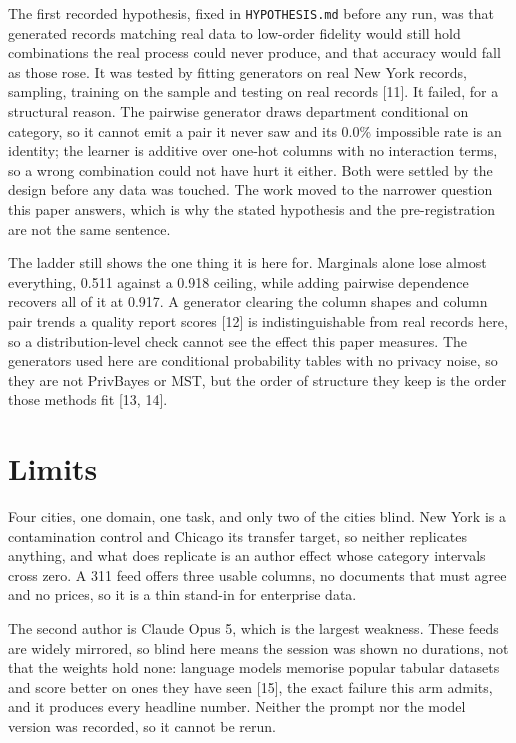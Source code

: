 \documentclass[10pt,a4paper,twocolumn]{article}
\begin{document}
The first recorded hypothesis, fixed in \texttt{HYPOTHESIS.md} before any run, was that
generated records matching real data to low-order fidelity would still hold
combinations the real process could never produce, and that accuracy would fall
as those rose. It was tested by fitting generators on real New York records,
sampling, training on the sample and testing on real records [11]. It failed,
for a structural reason. The pairwise generator draws department conditional on
category, so it cannot emit a pair it never saw and its 0.0\% impossible rate is
an identity; the learner is additive over one-hot columns with no interaction
terms, so a wrong combination could not have hurt it either. Both were settled
by the design before any data was touched. The work moved to the narrower
question this paper answers, which is why the stated hypothesis and the
pre-registration are not the same sentence.

The ladder still shows the one thing it is here for. Marginals alone lose almost
everything, 0.511 against a 0.918 ceiling, while adding pairwise dependence
recovers all of it at 0.917. A generator clearing the column shapes and column
pair trends a quality report scores [12] is indistinguishable from real records
here, so a distribution-level check cannot see the effect this paper measures.
The generators used here are conditional probability tables with no privacy
noise, so they are not PrivBayes or MST, but the order of structure they keep is
the order those methods fit [13, 14].

\section*{Limits}

Four cities, one domain, one task, and only two of the cities blind. New York is
a contamination control and Chicago its transfer target, so neither replicates
anything, and what does replicate is an author effect whose category intervals
cross zero. A 311 feed offers three usable columns, no documents that must agree
and no prices, so it is a thin stand-in for enterprise data.

The second author is Claude Opus 5, which is the largest weakness. These
feeds are widely mirrored, so blind here means the session was shown no
durations, not that the weights hold none: language models memorise popular
tabular datasets and score better on ones they have seen [15], the exact failure
this arm admits, and it produces every headline number. Neither the prompt nor
the model version was recorded, so it cannot be rerun.
\end{document}

